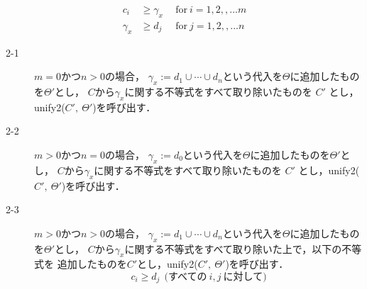 \begin{oframed}
\begin{description}
\begin{align*}
      c_i & \ge \gamma_x  ~~ & \text{for}~ i=1,2,,...m\\
      \gamma_x & \ge d_j  ~~ & \text{for}~ j=1,2,,...n
    \end{align*}
    \begin{description}
    \item[2-1] $m=0$かつ$n>0$の場合，
      $\gamma_x:=d_1 \cup \cdots \cup d_n$という代入を$\Theta$に追加したものを$\Theta'$とし，
      $C$から$\gamma_x$に関する不等式をすべて取り除いたものを $C'$ とし，unify2($C',~\Theta'$)を呼び出す．
    \item[2-2] $m>0$かつ$n=0$の場合，
      $\gamma_x:=d_0$という代入を$\Theta$に追加したものを$\Theta'$とし，
      $C$から$\gamma_x$に関する不等式をすべて取り除いたものを $C'$ とし，unify2($C',~\Theta'$)を呼び出す．
    \item[2-3] $m>0$かつ$n>0$の場合，
      $\gamma_x:=d_1 \cup \cdots \cup d_n$という代入を$\Theta$に追加したものを$\Theta'$とし，
      $C$から$\gamma_x$に関する不等式をすべて取り除いた上で，以下の不等式を
      追加したものを$C'$とし，unify2($C',~\Theta'$)を呼び出す．
      \[
        c_i \ge d_j   ~~\textrm{(すべての}~i,j~\textrm{に対して)}
      \]
    \end{description}
  \end{description}

\end{oframed}
